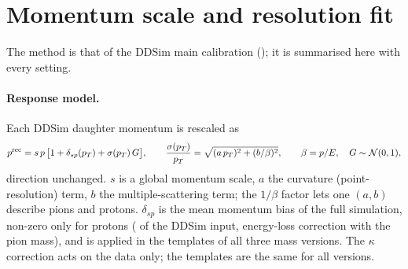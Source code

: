 \section{Momentum scale and resolution fit}
\label{sec:method}

The method is that of the DDSim main calibration (); it is summarised here with every setting.

\paragraph{Response model.} Each DDSim daughter momentum is rescaled as
\begin{equation}
p^{\rm rec}=s\,p\,\bigl[1+\delta_{sp}(p_T)+\sigma(p_T)\,G\bigr],\qquad
\frac{\sigma(p_T)}{p_T}=\sqrt{(a\,p_T)^2+(b/\beta)^2},\qquad \beta=p/E,\quad G\sim\mathcal N(0,1),
\label{eq:model}
\end{equation}
direction unchanged. $s$ is a global momentum scale, $a$ the curvature (point-resolution) term, $b$ the multiple-scattering term;
the $1/\beta$ factor lets one $(a,b)$ describe pions and protons. $\delta_{sp}$ is the mean momentum bias of the full simulation,
non-zero only for protons ( of the DDSim input, energy-loss correction with the pion mass), and is applied in the
templates of all three mass versions. The $\kappa$ correction acts on the data only; the templates are the same for all versions.

